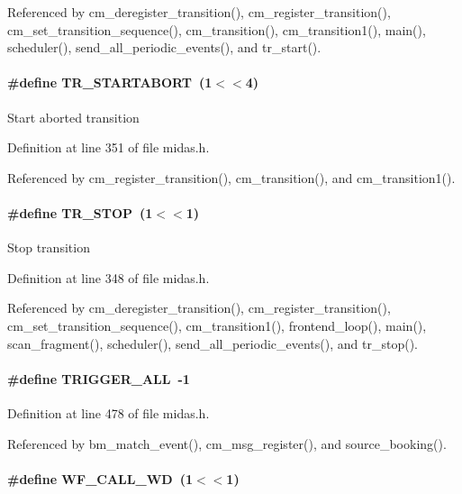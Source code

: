 Referenced by cm\_\-deregister\_\-transition(), cm\_\-register\_\-transition(), cm\_\-set\_\-transition\_\-sequence(), cm\_\-transition(), cm\_\-transition1(), main(), scheduler(), send\_\-all\_\-periodic\_\-events(), and tr\_\-start().
\paragraph[{TR\_\-STARTABORT}]{\setlength{\rightskip}{0pt plus 5cm}\#define TR\_\-STARTABORT~(1$<$$<$4)}\hfill\label{group__mdefineh_ga61faff4d81f378438500ef8971e2b7af}
Start aborted transition 

Definition at line 351 of file midas.h.

Referenced by cm\_\-register\_\-transition(), cm\_\-transition(), and cm\_\-transition1().
\paragraph[{TR\_\-STOP}]{\setlength{\rightskip}{0pt plus 5cm}\#define TR\_\-STOP~(1$<$$<$1)}\hfill\label{group__mdefineh_gadd7d0605113ff6e1b4e705d31332a1a0}
Stop transition 

Definition at line 348 of file midas.h.

Referenced by cm\_\-deregister\_\-transition(), cm\_\-register\_\-transition(), cm\_\-set\_\-transition\_\-sequence(), cm\_\-transition1(), frontend\_\-loop(), main(), scan\_\-fragment(), scheduler(), send\_\-all\_\-periodic\_\-events(), and tr\_\-stop().
\paragraph[{TRIGGER\_\-ALL}]{\setlength{\rightskip}{0pt plus 5cm}\#define TRIGGER\_\-ALL~-\/1}\hfill\label{group__mdefineh_ga26aa4bcea89857cb7ca669339695ceac}


Definition at line 478 of file midas.h.

Referenced by bm\_\-match\_\-event(), cm\_\-msg\_\-register(), and source\_\-booking().
\paragraph[{WF\_\-CALL\_\-WD}]{\setlength{\rightskip}{0pt plus 5cm}\#define WF\_\-CALL\_\-WD~(1$<$$<$1)}\hfill\label{group__mdefineh_ga4b7a6e985d401eb1521a14f52685e5cf}


